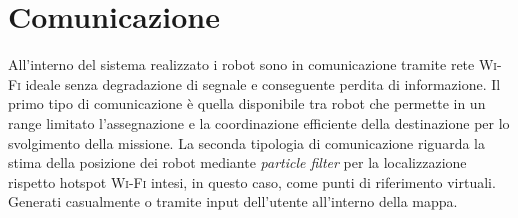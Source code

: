 \section{Comunicazione}
All'interno del sistema realizzato i robot sono in comunicazione tramite rete 
\textsc{Wi-Fi} ideale senza degradazione di segnale e conseguente perdita di 
informazione.
Il primo tipo di comunicazione è quella disponibile tra robot che permette in 
un range limitato l'assegnazione e la coordinazione efficiente della 
destinazione per lo svolgimento della missione.
La seconda tipologia di comunicazione riguarda la stima della posizione dei 
robot mediante \emph{particle filter} per la localizzazione rispetto hotspot 
\textsc{Wi-Fi} intesi, in questo caso, come punti di riferimento virtuali.
Generati casualmente o tramite input dell'utente all'interno 
della mappa.